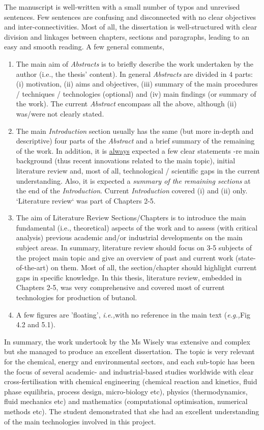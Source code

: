 \documentclass[14pt,twoside]{report}
\newcommand{\ie}{{\it i.e.,}}
\newcommand{\eg}{{\it e.g.,}}
\begin{document}
The manuscript is well-written with a small number of typos and unrevised sentences. Few sentences are confusing and disconnected with no clear objectives and inter-connectivities. Most of all, the dissertation is well-structured with clear division and linkages between chapters, sections and paragraphs, leading to an easy and smooth reading. A few general comments,
\begin{enumerate}
%
\item The main aim of {\it Abstracts} is to briefly describe the work undertaken by the author (i.e., the thesis' content). In general {\it Abstracts} are divided in 4 parts: (i) motivation, (ii) aims and objectives, (iii) summary of the main procedures / techniques / technologies (optional) and (iv) main findings (or summary of the work). The current {\it Abstract} encompass all the above, although (ii) was/were not clearly stated.
%
\item The main {\it Introduction} section usually has the same (but more in-depth and descriptive) four parts of the {\it Abstract} and a brief summary of the remaining of the work. In addition, it is \underline{always} expected a few clear statements -re main background (thus recent innovations related to the main topic), initial literature review and, most of all, technological / scientific gaps in the current understanding. Also, it is expected a {\it summary of the remaining sections} at the end of the {\it Introduction}.  Current {\it Introduction} covered (i) and (ii) only. `Literature review` was part of Chapters 2-5.
%
\item The aim of Literature Review Sections/Chapters is to introduce the main fundamental (i.e., theoretical) aspects of the work and to assess (with critical analysis) previous academic and/or industrial developments on the main subject areas. In summary, literature review should focus on 3-5 subjects of the project main topic and give an overview of past and current work (state-of-the-art) on them. Most of all, the section/chapter should highlight current gaps in specific knowledge. In this thesis, literature review, embedded in Chapters 2-5, was very comprehensive and covered most of current technologies for production of butanol. 
%
\item A few figures are 'floating', \ie with no reference in the main text (\eg Fig 4.2 and 5.1).
% 
\end{enumerate}
In summary, the work undertook by the Ms Wisely was extensive and complex but she managed to produce an excellent dissertation. The topic is very relevant for the chemical, energy and environmental sectors, and each sub-topic has been the focus of several academic- and industrial-based studies worldwide with clear cross-fertilisation with chemical engineering (chemical reaction and kinetics, fluid phase equilibria, process design, micro-biology etc), physics (thermodynamics, fluid mechanics etc) and mathematics (computational optimisation, numerical methods etc). The student demonstrated that she had an excellent understanding of the main technologies involved in this project.
\end{document}
